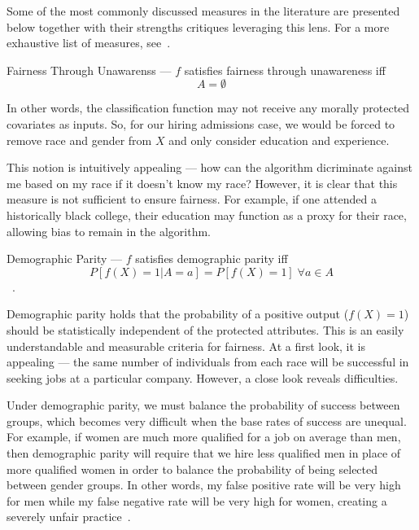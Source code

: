Some of the most commonly discussed measures in the literature are presented
below together with their strengths critiques leveraging this lens. For a more
exhaustive list of measures, see~\cite{CorbettDavies_2023}.


\begin{definition}
    Fairness Through Unawarenss — $f$ satisfies fairness through unawareness iff
    \[A = \emptyset\]
\end{definition}

In other words, the classification function may not receive any morally
protected covariates as inputs. So, for our hiring admissions case, we would be
forced to remove race and gender from $X$ and only consider education and
experience.

This notion is intuitively appealing — how can the algorithm dicriminate against
me based on my race if it doesn't know my race? However, it is clear that this
measure is not sufficient to ensure fairness. For example, if one attended a
historically black college, their education may function as a proxy for their
race, allowing bias to remain in the algorithm.

\begin{definition}
    Demographic Parity — $f$ satisfies demographic parity iff
    \[P[f(X) = 1 | A = a] = P[f(X) = 1]\;\forall a \in A\]~\citep{Dwork_2012}.
\end{definition}

Demographic parity holds that the probability of a positive output ($f(X) = 1$)
should be statistically independent of the protected attributes. This is 
an easily understandable and measurable criteria for fairness. At a first look,
it is appealing — the same number of individuals from each race will be
successful in seeking jobs at a particular company. However, a close look
reveals difficulties.

Under demographic parity, we must balance the probability of success between
groups, which becomes very difficult when the base rates of success are
unequal. For example, if women are much more qualified for a job on average than
men, then demographic parity will require that we hire less qualified men in
place of more qualified women in order to balance the probability of being selected
between gender groups. In other words, my false positive rate will be very high
for men while my false negative rate will be very high for women, creating a 
severely unfair practice~\citep{Barocas_2017}.

